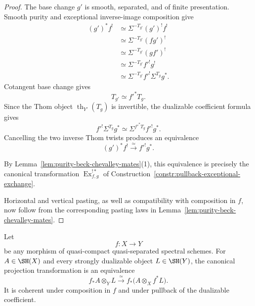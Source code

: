 \begin{proof}
The base change \(g'\) is smooth, separated, and of finite presentation.
Smooth purity and exceptional inverse-image composition give
\[
\begin{aligned}
    (g')^*f^!
    &\simeq
    \Sigma^{-T_{g'}}(g')^!f^! \\
    &\simeq
    \Sigma^{-T_{g'}}(fg')^! \\
    &\simeq
    \Sigma^{-T_{g'}}(gf')^! \\
    &\simeq
    \Sigma^{-T_{g'}}f'^!g^! \\
    &\simeq
    \Sigma^{-T_{g'}}f'^!\Sigma^{T_g}g^*.
\end{aligned}
\]
Cotangent base change gives
\[
    T_{g'}
    \simeq
    f'^*T_g.
\]
Since the Thom object \(\operatorname{th}_{Y'}(T_g)\) is invertible, the
dualizable coefficient formula gives
\[
    f'^!\Sigma^{T_g}g^*
    \simeq
    \Sigma^{f'^*T_g}f'^!g^*.
\]
Cancelling the two inverse Thom twists produces an equivalence
\[
    (g')^*f^!
    \xrightarrow{\simeq}
    f'^!g^*.
\]

By
Lemma~\ref{lem:purity-beck-chevalley-mates}(1),
this equivalence is precisely the canonical transformation
\(\operatorname{Ex}^{!*}_{f,g}\) of
Construction~\ref{constr:pullback-exceptional-exchange}.

Horizontal and vertical pasting, as well as compatibility with composition
in \(f\), now follow from the corresponding pasting laws in
Lemma~\ref{lem:purity-beck-chevalley-mates}.
\end{proof}

\begin{lemma}
\label{lem:arbitrary-direct-image-dualizable-projection}
Let
\[
    f:X\longrightarrow Y
\]
be any morphism of quasi-compact quasi-separated spectral schemes.  For
\(A\in\SH(X)\) and every strongly dualizable object \(L\in\SH(Y)\), the
canonical projection transformation is an equivalence
\[
    f_*A\otimes_YL
    \xrightarrow{\simeq}
    f_*
    \bigl(
      A\otimes_Xf^*L
    \bigr).
\]
It is coherent under composition in \(f\) and under pullback of the
dualizable coefficient.
\end{lemma}

